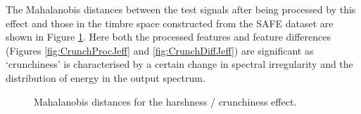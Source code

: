 		The Mahalanobis distances between the test signals after being processed by this effect and those in the
		timbre space constructed from the SAFE dataset are shown in Figure \ref{fig:CrunchJeffs}. Here both the
		processed features and feature differences (Figures \ref{fig:CrunchProcJeff} and \ref{fig:CrunchDiffJeff})
		are significant as `crunchiness' is characterised by a certain change in spectral irregularity and the
		distribution of energy in the output spectrum.

		\begin{figure}[h!]
			\centering
			\quad
			\caption{Mahalanobis distances for the harshness / crunchiness effect.}
			\label{fig:CrunchJeffs}
		\end{figure}

